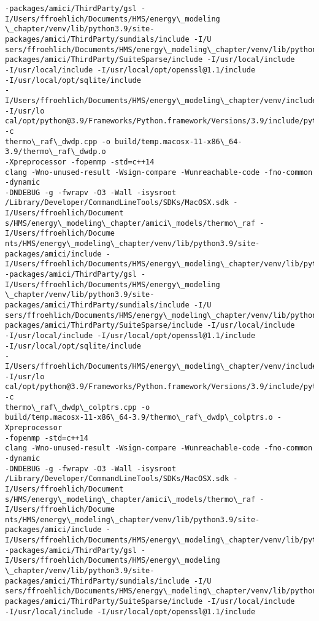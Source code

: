 \documentclass[11pt]{article}
\begin{document}
\begin{Verbatim}[commandchars=\\\{\}]
-packages/amici/ThirdParty/gsl -I/Users/ffroehlich/Documents/HMS/energy\_modeling
\_chapter/venv/lib/python3.9/site-packages/amici/ThirdParty/sundials/include -I/U
sers/ffroehlich/Documents/HMS/energy\_modeling\_chapter/venv/lib/python3.9/site-
packages/amici/ThirdParty/SuiteSparse/include -I/usr/local/include
-I/usr/local/include -I/usr/local/opt/openssl@1.1/include
-I/usr/local/opt/sqlite/include
-I/Users/ffroehlich/Documents/HMS/energy\_modeling\_chapter/venv/include -I/usr/lo
cal/opt/python@3.9/Frameworks/Python.framework/Versions/3.9/include/python3.9 -c
thermo\_raf\_dwdp.cpp -o build/temp.macosx-11-x86\_64-3.9/thermo\_raf\_dwdp.o
-Xpreprocessor -fopenmp -std=c++14
clang -Wno-unused-result -Wsign-compare -Wunreachable-code -fno-common -dynamic
-DNDEBUG -g -fwrapv -O3 -Wall -isysroot
/Library/Developer/CommandLineTools/SDKs/MacOSX.sdk -I/Users/ffroehlich/Document
s/HMS/energy\_modeling\_chapter/amici\_models/thermo\_raf -I/Users/ffroehlich/Docume
nts/HMS/energy\_modeling\_chapter/venv/lib/python3.9/site-packages/amici/include -
I/Users/ffroehlich/Documents/HMS/energy\_modeling\_chapter/venv/lib/python3.9/site
-packages/amici/ThirdParty/gsl -I/Users/ffroehlich/Documents/HMS/energy\_modeling
\_chapter/venv/lib/python3.9/site-packages/amici/ThirdParty/sundials/include -I/U
sers/ffroehlich/Documents/HMS/energy\_modeling\_chapter/venv/lib/python3.9/site-
packages/amici/ThirdParty/SuiteSparse/include -I/usr/local/include
-I/usr/local/include -I/usr/local/opt/openssl@1.1/include
-I/usr/local/opt/sqlite/include
-I/Users/ffroehlich/Documents/HMS/energy\_modeling\_chapter/venv/include -I/usr/lo
cal/opt/python@3.9/Frameworks/Python.framework/Versions/3.9/include/python3.9 -c
thermo\_raf\_dwdp\_colptrs.cpp -o
build/temp.macosx-11-x86\_64-3.9/thermo\_raf\_dwdp\_colptrs.o -Xpreprocessor
-fopenmp -std=c++14
clang -Wno-unused-result -Wsign-compare -Wunreachable-code -fno-common -dynamic
-DNDEBUG -g -fwrapv -O3 -Wall -isysroot
/Library/Developer/CommandLineTools/SDKs/MacOSX.sdk -I/Users/ffroehlich/Document
s/HMS/energy\_modeling\_chapter/amici\_models/thermo\_raf -I/Users/ffroehlich/Docume
nts/HMS/energy\_modeling\_chapter/venv/lib/python3.9/site-packages/amici/include -
I/Users/ffroehlich/Documents/HMS/energy\_modeling\_chapter/venv/lib/python3.9/site
-packages/amici/ThirdParty/gsl -I/Users/ffroehlich/Documents/HMS/energy\_modeling
\_chapter/venv/lib/python3.9/site-packages/amici/ThirdParty/sundials/include -I/U
sers/ffroehlich/Documents/HMS/energy\_modeling\_chapter/venv/lib/python3.9/site-
packages/amici/ThirdParty/SuiteSparse/include -I/usr/local/include
-I/usr/local/include -I/usr/local/opt/openssl@1.1/include

\end{Verbatim}
\end{document}
